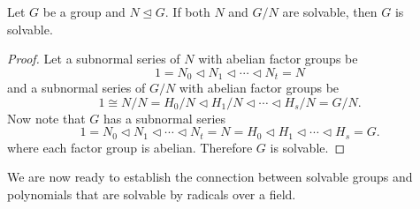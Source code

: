 \begin{theorem}\label{thrm-normal-group-and-quotient-group-solvable-means-base-group-is-solvable}
    Let $G$ be a group and $N \unlhd G$. If both $N$ and $G/N$ are solvable, then $G$ is solvable.
\end{theorem}
\begin{proof}
    Let a subnormal series of $N$ with abelian factor groups be
    \[
        1 = N_0 \lhd N_1 \lhd \cdots \lhd N_t = N
    \]
    and a subnormal series of $G/N$ with abelian factor groups be
    \[
        1 \cong N/N = H_0/N \lhd H_1/N \lhd \cdots \lhd H_s/N = G/N.
    \]
    Now note that $G$ has a subnormal series
    \[
        1 = N_0 \lhd N_1 \lhd \cdots \lhd N_t = N = H_0 \lhd H_1 \lhd \cdots \lhd H_s = G.
    \]
    where each factor group is abelian. Therefore $G$ is solvable.
\end{proof}

We are now ready to establish the connection between solvable groups and polynomials that are solvable by radicals over a field.

